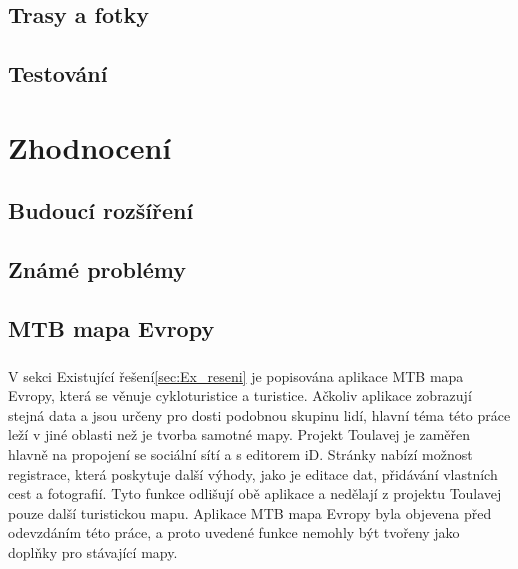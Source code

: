 \documentclass[11pt,a4paper,titlepage,oneside]{book}
\begin{document}
		\section{Trasy a fotky}


			\paragraph{}

		\section{Testování}


	\chapter{Zhodnocení}
		\section{Budoucí rozšíření}

		\section{Známé problémy}

		\section{MTB mapa Evropy}
			\paragraph{} V sekci Existující řešení\ref{sec:Ex_reseni} je popisována aplikace MTB mapa Evropy, která se věnuje cykloturistice a turistice. Ačkoliv aplikace zobrazují stejná data a jsou určeny pro dosti podobnou skupinu lidí, hlavní téma této práce leží v jiné oblasti než je tvorba samotné mapy. Projekt Toulavej je zaměřen hlavně na propojení se sociální sítí a s editorem iD. Stránky  nabízí možnost registrace, která poskytuje další výhody, jako je editace dat, přidávání vlastních cest a fotografií. Tyto funkce odlišují obě aplikace a nedělají z projektu Toulavej pouze další turistickou mapu. Aplikace MTB mapa Evropy byla objevena před odevzdáním této práce, a proto uvedené funkce nemohly být tvořeny jako doplňky pro stávající mapy.
\end{document}
